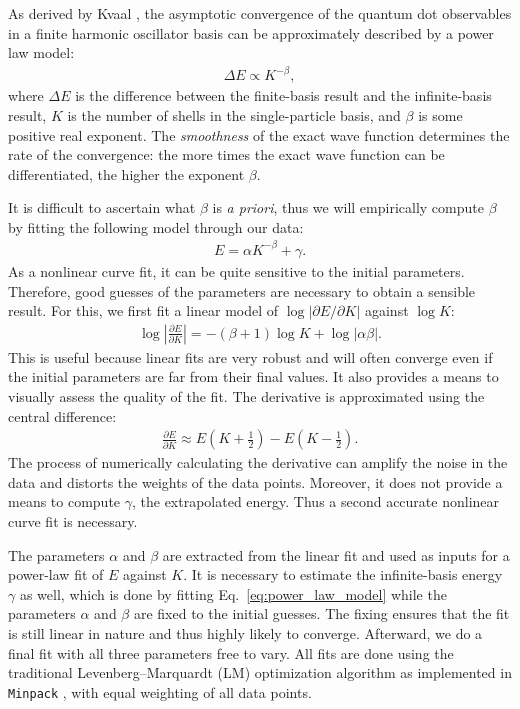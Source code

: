 As derived by Kvaal \cite{PhysRevB.80.045321,Kvaal2007}, the asymptotic convergence of the quantum dot observables in a finite harmonic oscillator basis can be approximately described by a power law model:
\begin{align*}
  \Delta E \propto K^{-\beta},
\end{align*}
where $\Delta E$ is the difference between the finite-basis result and the infinite-basis result, $K$ is the number of shells in the single-particle basis, and $\beta$ is some positive real exponent.  The \textit{smoothness} of the exact wave function determines the rate of the convergence: the more times the exact wave function can be differentiated, the higher the exponent $\beta$.

It is difficult to ascertain what $\beta$ is \textit{a priori}, thus we will empirically compute $\beta$ by fitting the following model through our data:
\begin{align} \label{eq:power_law_model}
  E = \alpha K^{-\beta} + \gamma.
\end{align}
As a nonlinear curve fit, it can be quite sensitive to the initial parameters.  Therefore, good guesses of the parameters are necessary to obtain a sensible result.  For this, we first fit a linear model of $\log |\partial E / \partial K|$ against $\log K$:
\begin{align*}
  \log \left|\frac{\partial E}{\partial K}\right| = - (\beta + 1) \log K + \log|\alpha \beta|.
\end{align*}
This is useful because linear fits are very robust and will often converge even if the initial parameters are far from their final values.  It also provides a means to visually assess the quality of the fit.  The derivative is approximated using the central difference:
\begin{align*}
  \frac{\partial E}{\partial K} \approx E\left(K + \frac{1}{2}\right) - E\left(K - \frac{1}{2}\right).
\end{align*}
The process of numerically calculating the derivative can amplify the
noise in the data and distorts the weights of the data points.
Moreover, it does not provide a means to compute $\gamma$, the
extrapolated energy.  Thus a second accurate nonlinear curve fit is
necessary.

The parameters $\alpha$ and $\beta$ are extracted from the linear fit
and used as inputs for a power-law fit of $E$ against $K$.  It is
necessary to estimate the infinite-basis energy $\gamma$ as well,
which is done by fitting Eq.\ \eqref{eq:power_law_model} while the
parameters $\alpha$ and $\beta$ are fixed to the initial guesses.  The
fixing ensures that the fit is still linear in nature and thus highly
likely to converge.  Afterward, we do a final fit with all three
parameters free to vary.  All fits are done using the traditional
Levenberg--Marquardt (LM) optimization
algorithm \cite{10.2307/43633451,doi:10.1137/0111030} as implemented
in \texttt{Minpack} \cite{More1978,More:126569}, with equal weighting
of all data points.

